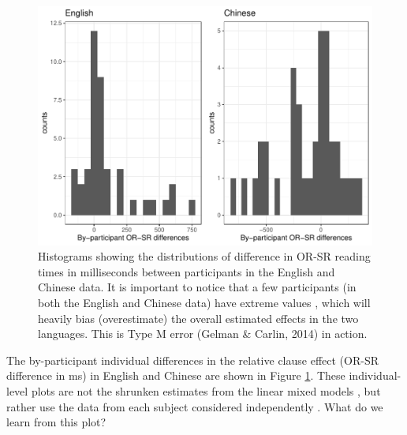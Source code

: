\documentclass{ar-1col}\usepackage[]{graphicx}\usepackage[]{color}
\makeatletter
\def\maxwidth{ %
  \ifdim\Gin@nat@width>\linewidth
    \linewidth
  \else
    \Gin@nat@width
  \fi
}
\newenvironment{knitrout}{}{} %
\makeatother
\begin{document}


\begin{figure}[!htbp]
\centering
\begin{knitrout}
\color{fgcolor}

{\centering \includegraphics[width=\maxwidth]{figures/fig-histplots-1} 

}


\end{knitrout}
\caption{Histograms showing the distributions of difference in OR-SR reading times in milliseconds between participants in the English and Chinese data. It is important to notice that a few participants (in both the English and Chinese data) have extreme values , which will heavily bias (overestimate) the overall estimated effects in the two languages. This is Type M error (Gelman \& Carlin, 2014) in action.}\label{fig:histplot}
\end{figure}


The by-participant individual differences in the relative clause effect (OR-SR difference in ms) in English and Chinese are shown in Figure \ref{fig:histplot}. These individual-level plots are not the shrunken estimates from the linear mixed models \citep{lme4new}, but rather use the data from each subject considered independently \citep[from the so-called no-pooling model, ][]{gelmanhill07,VasishthEtAlFreq2019,NicenboimEtAlBayes2019}. What do we learn from this plot?
\end{document}
